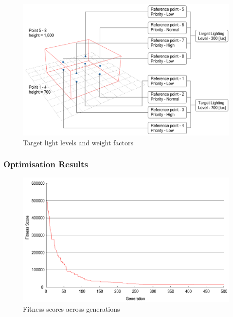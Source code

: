\begin{figure}[htbp]
\centering
\includegraphics[width=\textwidth]{./Images/28-RFDSpriorities}
\caption[RFDS Target Light Levels]{Target light levels and weight factors \cite{kawakita01}}
\label{fig:RFDSpriorities}
\end{figure}

\subsubsection{Optimisation Results}

\begin{figure}[h]
\centering
\includegraphics[width=\textwidth]{./Images/29-RFDSfitnessscores}
\caption[RFDS Fitness Scores]{Fitness scores across generations \cite{kawakita01}}
\label{fig:RFDSfitness}
\end{figure}

